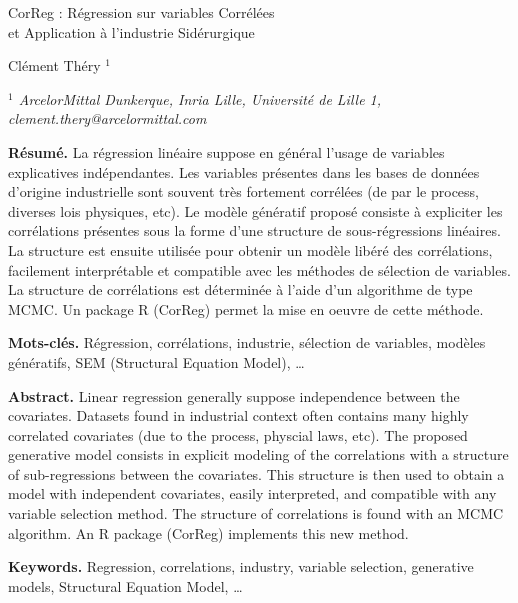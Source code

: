 \documentclass[12pt]{article}
\begin{document}
     \def\Var{{\rm Var}\,}


\begin{center}
{\Large
	{\sc  CorReg : Régression sur variables Corrélées\\ et Application à l'industrie Sidérurgique}
}
\bigskip

 Clément Théry $^{1}$
\bigskip

{\it
$^{1}$ ArcelorMittal Dunkerque, Inria Lille, Université de Lille 1, clement.thery@arcelormittal.com
 
}
\end{center}
\bigskip


{\bf Résumé.} La régression linéaire suppose en général l'usage de variables explicatives indépendantes. Les variables présentes dans les bases de données d'origine industrielle sont souvent très fortement corrélées (de par le process, diverses lois physiques, etc). Le modèle génératif proposé consiste à expliciter les corrélations présentes sous la forme d'une structure de sous-régressions linéaires. La structure est ensuite utilisée pour obtenir un modèle libéré des corrélations, facilement interprétable et compatible avec les méthodes de sélection de variables. La structure de corrélations est déterminée à l'aide d'un algorithme de type MCMC. Un package R (CorReg) permet la mise en oeuvre de cette méthode. 
\smallskip

{\bf Mots-clés.} Régression, corrélations, industrie, sélection de variables, modèles génératifs, SEM (Structural Equation Model), \ldots
\bigskip\bigskip

{\bf Abstract.} Linear regression generally suppose independence between the covariates. Datasets found in industrial context often contains many highly correlated covariates (due to the process, physcial laws, etc). The proposed generative model consists in explicit modeling of the correlations with a structure of sub-regressions between the covariates. This structure is then used to obtain a model with independent covariates, easily interpreted, and compatible with any variable selection method. The structure of correlations is found with an MCMC algorithm. An R package (CorReg) implements this new method.  
\smallskip

{\bf Keywords.} Regression, correlations, industry, variable selection, generative models, Structural Equation Model, \ldots
\end{document}
